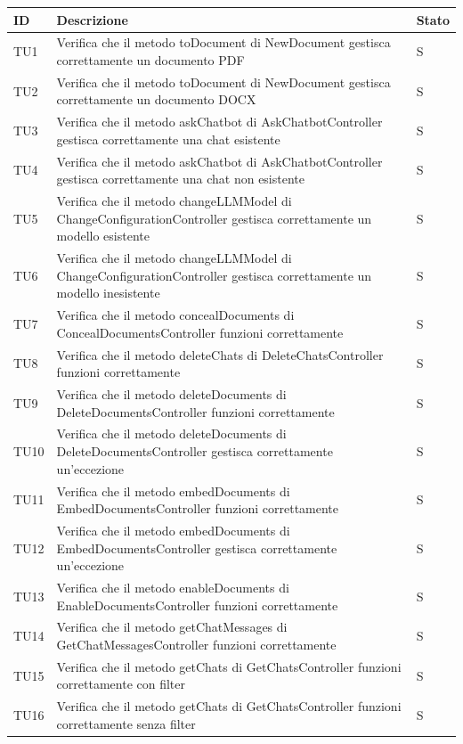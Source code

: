 \documentclass[10pt, a4paper]{article}
\begin{document}
\renewcommand{\arraystretch}{1.5}
\begin{xltabular}{\textwidth}{p{0.12\textwidth}|p{0.7\textwidth}|X}
\textbf{ID} & \textbf{Descrizione} & \textbf{Stato}  \\
\hline
TU1 & Verifica che il metodo toDocument di NewDocument gestisca correttamente un documento PDF & S \\
\hline
TU2 & Verifica che il metodo toDocument di NewDocument gestisca correttamente un documento DOCX & S \\
\hline
TU3 & Verifica che il metodo askChatbot di AskChatbotController gestisca correttamente una chat esistente & S \\
\hline
TU4 & Verifica che il metodo askChatbot di AskChatbotController gestisca correttamente una chat non esistente & S \\
\hline
TU5 & Verifica che il metodo changeLLMModel di ChangeConfigurationController gestisca correttamente un modello esistente & S \\
\hline
TU6 & Verifica che il metodo changeLLMModel di ChangeConfigurationController gestisca correttamente un modello inesistente & S \\
\hline
TU7 & Verifica che il metodo concealDocuments di ConcealDocumentsController funzioni correttamente & S \\
\hline
TU8 & Verifica che il metodo deleteChats di DeleteChatsController funzioni correttamente & S \\
\hline
TU9 & Verifica che il metodo deleteDocuments di DeleteDocumentsController funzioni correttamente & S \\
\hline
TU10 & Verifica che il metodo deleteDocuments di DeleteDocumentsController gestisca correttamente un'eccezione & S \\
\hline
TU11 & Verifica che il metodo embedDocuments di EmbedDocumentsController funzioni correttamente & S \\
\hline
TU12 & Verifica che il metodo embedDocuments di EmbedDocumentsController gestisca correttamente un'eccezione & S \\
\hline
TU13 & Verifica che il metodo enableDocuments di EnableDocumentsController funzioni correttamente & S \\
\hline
TU14 & Verifica che il metodo getChatMessages di GetChatMessagesController funzioni correttamente & S \\
\hline
TU15 & Verifica che il metodo getChats di GetChatsController funzioni correttamente con filter & S \\
\hline
TU16 & Verifica che il metodo getChats di GetChatsController funzioni correttamente senza filter & S \\

\end{xltabular}
\end{document}
